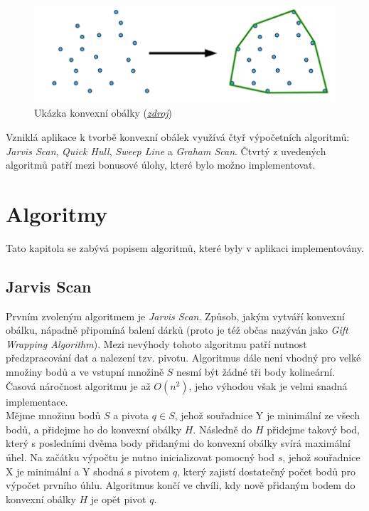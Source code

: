 \documentclass[a4paper, 12pt]{article}
\begin{document}
\begin{figure}[h!]
	\centering
	\includegraphics[width=13cm]{./pictures/ch.png}
	\caption{Ukázka konvexní obálky (\href{http://mind.cs.byu.edu/courses/312/projects/project2_files/ConvexHull_python.php}{\textsl{zdroj}})}
\end{figure}

Vzniklá aplikace k tvorbě konvexní obálek využívá čtyř výpočetních algoritmů: \textit{Jarvis Scan}, \textit{Quick Hull}, \textit{Sweep Line} a \textit{Graham Scan}. Čtvrtý z uvedených algoritmů patří mezi bonusové úlohy, které bylo možno implementovat.

\section{Algoritmy}
Tato kapitola se zabývá popisem algoritmů, které byly v aplikaci implementovány. 

\subsection{Jarvis Scan}
Prvním zvoleným algoritmem je \textit{Jarvis Scan}. Způsob, jakým vytváří konvexní obálku, nápadně připomíná balení dárků (proto je též občas nazýván jako \textit{Gift Wrapping Algorithm}). Mezi nevýhody tohoto algoritmu patří nutnost předzpracování dat a nalezení tzv. pivotu. Algoritmus dále není vhodný pro velké množiny bodů a ve vstupní množině $S$ nesmí být žádné tři body kolineární. Časová náročnost algoritmu je až $O(n^2)$, jeho výhodou však je velmi snadná implementace. \\

Mějme množinu bodů $S$ a pivota $q \in S$, jehož souřadnice Y je minimální ze všech bodů, a přidejme ho do konvexní obálky $H$. Následně do $H$ přidejme takový bod, který s posledními dvěma body přidanými do konvexní obálky svírá maximální úhel. Na začátku výpočtu je nutno inicializovat pomocný bod $s$, jehož souřadnice X je minimální a Y shodná s pivotem $q$, který zajistí dostatečný počet bodů pro výpočet prvního úhlu. Algoritmus končí ve chvíli, kdy nově přidaným bodem do konvexní obálky $H$ je opět pivot $q$. \\
\end{document}
